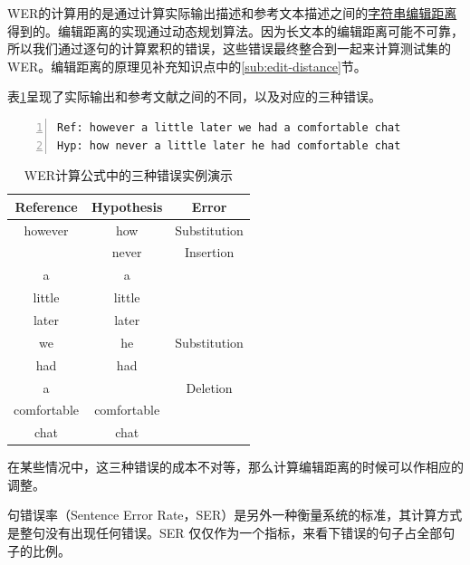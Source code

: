 WER的计算用的是通过计算实际输出描述和参考文本描述之间的\href{https://en.wikipedia.org/wiki/Edit_distance}{字符串编辑距离}得到的。编辑距离的实现通过动态规划算法。因为长文本的编辑距离可能不可靠，所以我们通过逐句的计算累积的错误，这些错误最终整合到一起来计算测试集的WER。编辑距离的原理见补充知识点中的\ref{sub:edit-distance}节。

表\ref{tab:wer}呈现了实际输出和参考文献之间的不同，以及对应的三种错误。
\begin{lstlisting}[language = python, numbers=left, 
         numberstyle=\tiny,keywordstyle=\color{blue!70},
         commentstyle=\color{red!50!green!50!blue!50},frame=shadowbox,
         rulesepcolor=\color{red!20!green!20!blue!20},basicstyle=\ttfamily]
Ref: however a little later we had a comfortable chat
Hyp: how never a little later he had comfortable chat
\end{lstlisting}
\begin{table}[h]
 \centering
 \caption{WER计算公式中的三种错误实例演示}
   \begin{tabular*}{1\textwidth}{@{\extracolsep{\fill}}ccc}
   \toprule
    {\bf Reference} & {\bf Hypothesis} & {\bf Error} \\
   \midrule
   however      &        how  & Substitution \\ \hline
                &      never  &  Insertion   \\ \hline
         a      &          a  &              \\ \hline
    little      &     little  &              \\ \hline
    later       &      later  &              \\ \hline
    we          &         he  & Substitution  \\ \hline
    had         &        had  &              \\ \hline
    a           &             &   Deletion   \\ \hline
	comfortable   & comfortable &              \\ \hline
      chat      &       chat  &              \\
   \bottomrule
   \end{tabular*}%
 \label{tab:wer}%
\end{table}%

在某些情况中，这三种错误的成本不对等，那么计算编辑距离的时候可以作相应的调整。

句错误率（Sentence Error Rate，SER）是另外一种衡量系统的标准，其计算方式是整句没有出现任何错误。SER 仅仅作为一个指标，来看下错误的句子占全部句子的比例。

